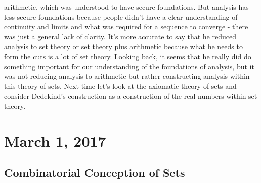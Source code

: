 \documentclass[12pt]{article}
\theoremstyle{definition}
\begin{document}
\begin{itemize}
        arithmetic, which was understood to have secure foundations. But
        analysis has less secure foundations because people didn't have a clear
        understanding of continuity and limits and what was required for a
        sequence to converge - there was just a general lack of clarity. It's
        more accurate to say that he reduced analysis to set theory or set
        theory plus arithmetic because what he needs to form the cuts is a lot
        of set theory. Looking back, it seems that he really did do something
        important for our understanding of the foundations of analysis, but it
        was not reducing analysis to arithmetic but rather constructing
        analysis within this theory of sets. Next time let's look at the
        axiomatic theory of sets and consider Dedekind's construction as a
        construction of the real numbers within set theory.

\end{itemize}

\section{March 1, 2017}

\subsection{Combinatorial Conception of Sets}
\end{document}
